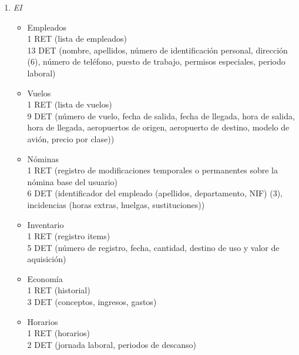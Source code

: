 \begin{enumerate}
\begin{itemize}
			{1 RET (historial)}\\
			{3 DET (conceptos, ingresos, gastos)}\\
			\item Horarios \\
			{2 RET (horarios, ley vigente)}\\
			{3 DET (jornada laboral, periodos de descanso y días festivos)}\\
			\item Modelos de avión \\
			{1 RET (registro de localización de aeropuertos)}\\
			{13 DET (número de aviones de cada modelo, número de pasajeros, tipo de combustible, dimensiones del avión, fabricante,
			versión, serie, coste, fecha de construcción, estado, consumo medio, peso del avión, motores)}\\
		\end{itemize}

	\item \textit{EI}

		\begin{itemize}
			\item Empleados \\
			{1 RET (lista de empleados)}\\
			{13 DET (nombre, apellidos, número de identificación personal, dirección (6), número de teléfono, puesto de trabajo,
			permisos especiales, periodo laboral)}\\
			\item Vuelos \\
			{1 RET (lista de vuelos)}\\
			{9 DET (número de vuelo, fecha de salida, fecha de llegada, hora de salida, hora de llegada, aeropuertos de origen,
			aeropuerto de destino, modelo de avión, precio por clase))}\\
			\item Nóminas \\
			{1 RET (registro de modificaciones temporales o permanentes sobre la nómina base del usuario)}\\
			{6 DET (identificador del empleado (apellidos, departamento, NIF) (3), incidencias (horas extras, huelgas, sustituciones))}\\
			\item Inventario \\
			{1 RET (registro items)}\\
			{5 DET (número de registro, fecha, cantidad, destino de uso y valor de aquisición)}\\
			\item Economía \\
			{1 RET (historial)}\\
			{3 DET (conceptos, ingresos, gastos)}\\
			\item Horarios \\
			{1 RET (horarios)}\\
			{2 DET (jornada laboral, periodos de descanso)}\\
		\end{itemize}


\end{enumerate}
